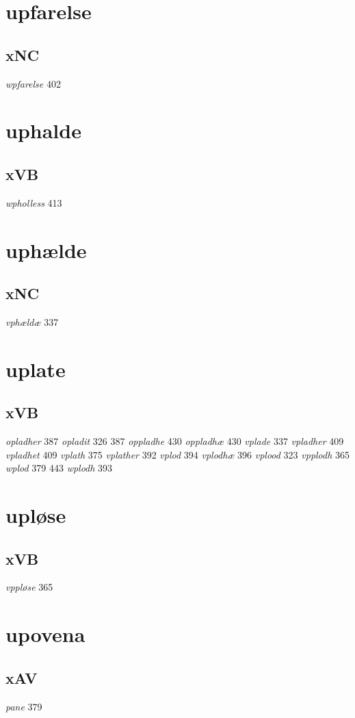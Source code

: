 \documentclass[a4paper,twocolumn]{article}
\begin{document}
\section{upfarelse}
\label{sec:org21ef5b0}
\subsection{xNC}
\label{sec:org8e35636}
\emph{wpfarelse} 402 
\section{uphalde}
\label{sec:orge1cbe20}
\subsection{xVB}
\label{sec:org153d8d4}
\emph{wpholless} 413 
\section{uphælde}
\label{sec:org5af92d4}
\subsection{xNC}
\label{sec:orgae65a30}
\emph{vphældæ} 337 
\section{uplate}
\label{sec:orgd4c2e40}
\subsection{xVB}
\label{sec:orgf2acbbc}
\emph{opladher} 387 \emph{opladit} 326 387 \emph{oppladhe} 430 \emph{oppladhæ} 430 \emph{vplade} 337 \emph{vpladher} 409 \emph{vpladhet} 409 \emph{vplath} 375 \emph{vplather} 392 \emph{vplod} 394 \emph{vplodhæ} 396 \emph{vplood} 323 \emph{vpplodh} 365 \emph{wplod} 379 443 \emph{wplodh} 393 
\section{upløse}
\label{sec:org6370f7a}
\subsection{xVB}
\label{sec:org3516ef0}
\emph{vppløse} 365 
\section{upovena}
\label{sec:orgc44939b}
\subsection{xAV}
\label{sec:org362f2e9}
\emph{pane} 379 
\end{document}
